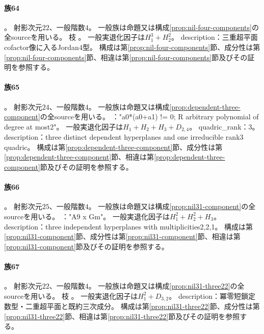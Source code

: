 \paragraph{族64}\label{catalogue:R4_NIL4_TRIPLE_H_DOUBLE_H_INSIDE_22}
。
射影次元$22$、一般階数$4$。
一般族は命題又は構成\ref{prop:nil-four-components}の全sourceを用いる。
枝 。
一般実退化因子は$H_{1}^{3}+H_{2}^{2}$。
description：三重超平面cofactor像に入るJordan4型。
構成は第\ref{prop:nil-four-components}節、成分性は第\ref{prop:nil-four-components}節、相違は第\ref{prop:nil-four-components}節及びその証明を参照する。

\paragraph{族65}\label{catalogue:R4_DEPENDENT_THREE_HYPERPLANES_QUADRIC_24}
。
射影次元$24$、一般階数$4$。
一般族は命題又は構成\ref{prop:dependent-three-component}の全sourceを用いる。
："a0*(a0+a1) != 0; R arbitrary polynomial of degree at most2"。
一般実退化因子は$H_{1}+H_{2}+H_{3}+D_{2,4}$。
quadric\_rank：3。
description：three distinct dependent hyperplanes and one irreducible rank3 quadric。
構成は第\ref{prop:dependent-three-component}節、成分性は第\ref{prop:dependent-three-component}節、相違は第\ref{prop:dependent-three-component}節及びその証明を参照する。

\paragraph{族66}\label{catalogue:R4_MODULAR_NIL31_DOUBLE_DOUBLE_H_25}
。
射影次元$25$、一般階数$4$。
一般族は命題又は構成\ref{prop:nil31-component}の全sourceを用いる。
："A9 x Gm"。
一般実退化因子は$H_{1}^{2}+H_{2}^{2}+H_{3}$。
description：three independent hyperplanes with multiplicities2,2,1。
構成は第\ref{prop:nil31-component}節、成分性は第\ref{prop:nil31-component}節、相違は第\ref{prop:nil31-component}節及びその証明を参照する。

\paragraph{族67}\label{catalogue:R4_NIL31_SHORT_DOUBLE_H_CUBIC_22}
。
射影次元$22$、一般階数$4$。
一般族は命題又は構成\ref{prop:nil31-three22}の全sourceを用いる。
枝 。
一般実退化因子は$H_{1}^{2}+D_{3,2}$。
description：冪零短鎖定数型・二重超平面と既約三次成分。
構成は第\ref{prop:nil31-three22}節、成分性は第\ref{prop:nil31-three22}節、相違は第\ref{prop:nil31-three22}節及びその証明を参照する。

